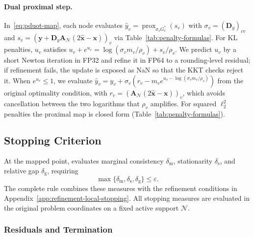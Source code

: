 \paragraph{Dual proximal step.}
In~\eqref{eq:pduot-map}, each node evaluates $\widehat{y}_v=\operatorname{prox}_{\sigma_v G_v^*}(s_v)$ with $\sigma_v=(\mathbf{D}_y)_{vv}$ and $s_v=(\mathbf{y}+\mathbf{D}_y\mathbf{A}_{\mathcal N}(2\widehat{\mathbf{x}}-\mathbf{x}))_v$ via Table~\ref{tab:penalty-formulas}.
For KL penalties, $u_v$ satisfies $u_v+e^{u_v}=\log(\sigma_v m_v/\rho_v)+s_v/\rho_v$.
We predict $u_v$ by a short Newton iteration in FP32 and refine it in FP64 to a rounding-level residual; if refinement fails, the update is exposed as NaN so that the KKT checks reject it.
When $e^{u_v}\le1$, we evaluate $\widehat y_v=y_v+\sigma_v(r_v-m_ve^{u_v-\log(\sigma_vm_v/\rho_v)})$ from the original optimality condition, with $r_v=(\mathbf A_{\mathcal N}(2\widehat{\mathbf x}-\mathbf x))_v$, which avoids cancellation between the two logarithms that $\rho_v$ amplifies.
For squared $\ell_2^2$ penalties the proximal map is closed form (Table~\ref{tab:penalty-formulas}).

\subsection{Stopping Criterion}
\label{app:stopping-criterion}

At the mapped point, \checkstop evaluates marginal consistency $\delta_{\mathrm m}$, stationarity $\delta_{\mathrm s}$, and relative gap $\delta_{\mathrm g}$, requiring
\begin{equation}
\label{eq:pduot-stopping}
\max\{\delta_{\mathrm m},\delta_{\mathrm s},\delta_{\mathrm g}\}\leq\varepsilon.
\end{equation}
The complete rule combines these measures with the refinement conditions in Appendix~\ref{app:refinement-local-stopping}.
All stopping measures are evaluated in the original problem coordinates on a fixed active support $\mathcal N$.

\subsubsection{Residuals and Termination}

